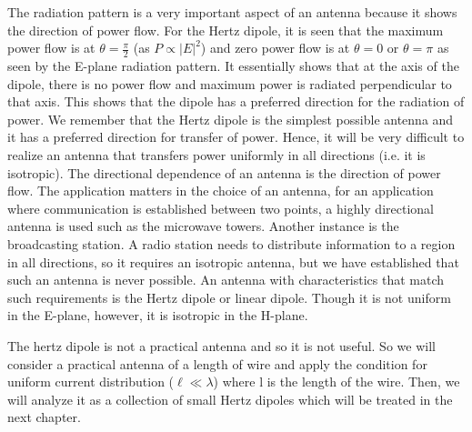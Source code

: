 The radiation pattern is a very important aspect of an antenna because it shows the direction of power flow. For the Hertz dipole, it is seen that the maximum power flow is at $\theta = \frac{\pi}{2}$ (as $P \propto  |E|^2 $) and zero power flow is at $\theta=0$ or $\theta=\pi$ as seen by the E-plane radiation pattern. It essentially shows that at the axis of the dipole, there is no power flow and maximum power is radiated perpendicular to that axis. This shows that the dipole has a preferred direction for the radiation of power. We remember that the Hertz dipole is the simplest possible antenna and it has a preferred direction for transfer of power. Hence, it will be very difficult to realize an antenna that transfers power uniformly in all directions (i.e. it is isotropic). The directional dependence of an antenna is the direction of power flow. The application matters in the choice of an antenna, for an application where communication is established between two points, a highly directional antenna is used such as the microwave towers. Another instance is the broadcasting station. A radio station needs to distribute information to a region in all directions, so it requires an isotropic antenna, but we have established that such an antenna is never possible. An antenna with characteristics that match such requirements is the Hertz dipole or linear dipole. Though it is not uniform in the E-plane, however, it is isotropic in the H-plane.

The hertz dipole is not a practical antenna and so it is not useful. So we will consider a practical antenna of a length of wire and apply the condition for uniform current distribution ($\ell \ll \lambda$) where l is the length of the wire. Then, we will analyze it as a collection of small Hertz dipoles which will be treated in the next chapter.
